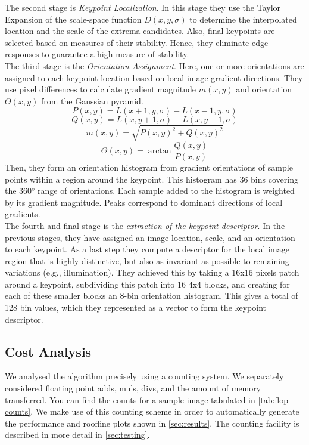 \documentclass[letterpaper]{article}
\begin{document}
The second stage is \emph{Keypoint Localization}. In this stage they use the Taylor Expansion of the scale-space function $D(x,y,\sigma)$ to determine the interpolated location and the scale of the extrema candidates. Also, final keypoints are selected based on measures of their stability. Hence, they eliminate edge responses to guarantee a high measure of stability.\\

The third stage is the \emph{Orientation Assignment}. Here, one or more orientations are assigned to each keypoint location based on local image gradient directions. They use pixel differences to calculate gradient magnitude $m(x,y)$ and orientation $\Theta(x,y)$ from the Gaussian pyramid.
\begin{equation}
    P(x,y)=L(x+1,y,\sigma) - L(x-1,y,\sigma)
\end{equation}
\begin{equation}
    Q(x,y)=L(x,y+1,\sigma)-L(x,y-1,\sigma)
\end{equation}
\begin{equation}
    m(x,y)=\sqrt{P(x,y)^2+Q(x,y)^2}
\end{equation}
\begin{equation}
    \Theta(x,y)=\arctan{\frac{Q(x,y)}{P(x,y)}}
\end{equation}
Then, they form an orientation histogram from gradient orientations of sample points within a region around the keypoint. This histogram has 36 bins covering the 360° range of orientations. Each sample added to the histogram is weighted by its gradient magnitude. Peaks correspond to dominant directions of local gradients.\\

The fourth and final stage is the \emph{extraction of the keypoint descriptor}. In the previous stages, they have assigned an image location, scale, and an orientation to each keypoint. As a last step they compute a descriptor for the local image region that is highly distinctive, but also as invariant as possible to remaining variations (e.g., illumination). They achieved this by taking a 16x16 pixels patch around a keypoint, subdividing this patch into 16 4x4 blocks, and creating for each of these smaller blocks an 8-bin orientation histogram. This gives a total of 128 bin values, which they represented as a vector to form the keypoint descriptor.


\subsection*{Cost Analysis}
We analysed the algorithm precisely using a counting system. We separately considered floating point adds, muls, divs, and the amount of memory transferred. You can find the counts for a sample image tabulated in \autoref{tab:flop-counts}. We make use of this counting scheme in order to automatically generate the performance and roofline plots shown in \autoref{sec:results}. The counting facility is described in more detail in \autoref{sec:testing}. \\
\end{document}
